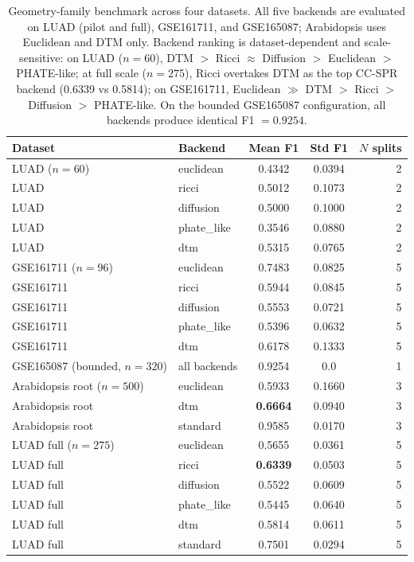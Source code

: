 \documentclass[11pt]{article}
\begin{document}
\begin{table}[h]
\centering
\small
\begin{tabular}{llccr}
\toprule
Dataset & Backend & Mean F1 & Std F1 & $N$ splits \\
\midrule
LUAD ($n=60$) & euclidean & 0.4342 & 0.0394 & 2 \\
LUAD & ricci & 0.5012 & 0.1073 & 2 \\
LUAD & diffusion & 0.5000 & 0.1000 & 2 \\
LUAD & phate\_like & 0.3546 & 0.0880 & 2 \\
LUAD & dtm & 0.5315 & 0.0765 & 2 \\
\midrule
GSE161711 ($n=96$) & euclidean & 0.7483 & 0.0825 & 5 \\
GSE161711 & ricci & 0.5944 & 0.0845 & 5 \\
GSE161711 & diffusion & 0.5553 & 0.0721 & 5 \\
GSE161711 & phate\_like & 0.5396 & 0.0632 & 5 \\
GSE161711 & dtm & 0.6178 & 0.1333 & 5 \\
\midrule
GSE165087 (bounded, $n=320$) & all backends & 0.9254 & 0.0 & 1 \\
\midrule
Arabidopsis root ($n=500$) & euclidean & 0.5933 & 0.1660 & 3 \\
Arabidopsis root & dtm & \textbf{0.6664} & 0.0940 & 3 \\
Arabidopsis root & standard & 0.9585 & 0.0170 & 3 \\
\midrule
LUAD full ($n=275$) & euclidean & 0.5655 & 0.0361 & 5 \\
LUAD full & ricci & \textbf{0.6339} & 0.0503 & 5 \\
LUAD full & diffusion & 0.5522 & 0.0609 & 5 \\
LUAD full & phate\_like & 0.5445 & 0.0640 & 5 \\
LUAD full & dtm & 0.5814 & 0.0611 & 5 \\
LUAD full & standard & 0.7501 & 0.0294 & 5 \\
\bottomrule
\end{tabular}
\caption{Geometry-family benchmark across four datasets.
All five backends are evaluated on LUAD (pilot and full), GSE161711, and GSE165087; Arabidopsis uses Euclidean and DTM only.
Backend ranking is dataset-dependent and scale-sensitive: on LUAD ($n=60$), DTM $>$ Ricci $\approx$ Diffusion $>$ Euclidean $>$ PHATE-like; at full scale ($n=275$), Ricci overtakes DTM as the top CC-SPR backend (0.6339 vs 0.5814); on GSE161711, Euclidean $\gg$ DTM $>$ Ricci $>$ Diffusion $>$ PHATE-like.
On the bounded GSE165087 configuration, all backends produce identical F1 $= 0.9254$.}
\label{tab:geobench}
\end{table}
\end{document}
